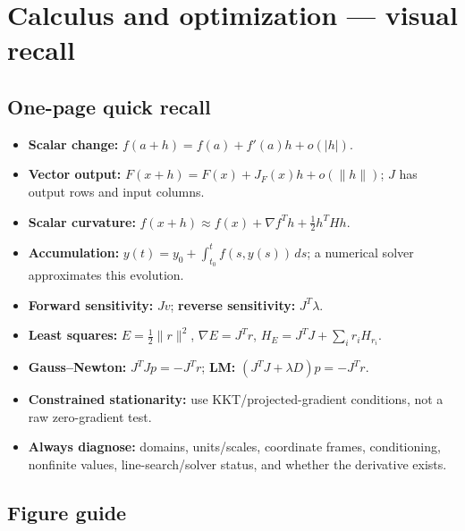 \hypertarget{appendix-adf48f5dc5c1}{}\label{referencestart:appendix-adf48f5dc5c1}
\section{Calculus and optimization --- visual recall}\label{appendix-adf48f5dc5c1-calculus-and-optimization-visual-recall}

\hypertarget{appendix-adf48f5dc5c1-calculus-and-optimization-visual-recall}{}

\subsection{One-page quick recall}\label{appendix-adf48f5dc5c1-one-page-quick-recall}

\hypertarget{appendix-adf48f5dc5c1-one-page-quick-recall}{}

\begin{itemize}
\tightlist
\item
  \textbf{Scalar change:} \(f(a+h)=f(a)+f'(a)h+o(|h|)\).
\item
  \textbf{Vector output:} \(F(x+h)=F(x)+J_F(x)h+o(\|h\|)\); \(J\) has output rows and input columns.
\item
  \textbf{Scalar curvature:} \(f(x+h)\approx f(x)+\nabla f^T h+\tfrac12h^THh\).
\item
  \textbf{Accumulation:} \(y(t)=y_0+\int_{t_0}^t f(s,y(s))\,ds\); a numerical solver approximates this evolution.
\item
  \textbf{Forward sensitivity:} \(Jv\); \textbf{reverse sensitivity:} \(J^T\lambda\).
\item
  \textbf{Least squares:} \(E=\tfrac12\|r\|^2\), \(\nabla E=J^Tr\), \(H_E=J^TJ+\sum_i r_iH_{r_i}\).
\item
  \textbf{Gauss--Newton:} \(J^TJp=-J^Tr\); \textbf{LM:} \((J^TJ+\lambda D)p=-J^Tr\).
\item
  \textbf{Constrained stationarity:} use KKT/projected-gradient conditions, not a raw zero-gradient test.
\item
  \textbf{Always diagnose:} domains, units/scales, coordinate frames, conditioning, nonfinite values, line-search/solver status, and whether the derivative exists.
\end{itemize}

\subsection{Figure guide}\label{appendix-adf48f5dc5c1-figure-guide}


